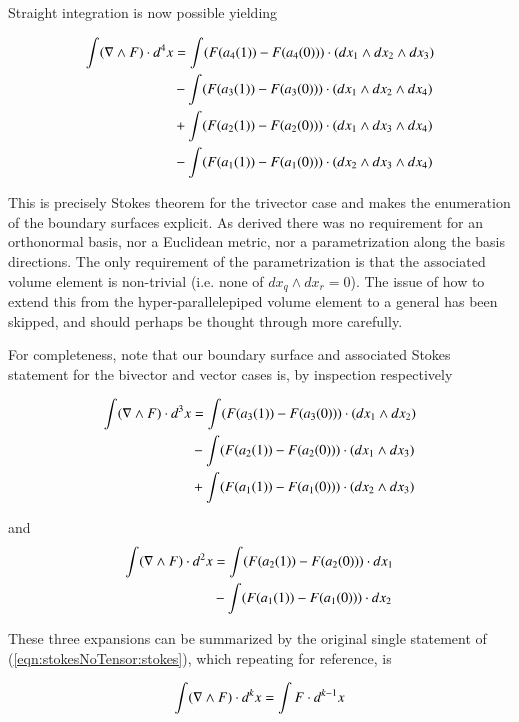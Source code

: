 Straight integration is now possible yielding

\begin{align*}
\int ( \nabla \wedge F ) \cdot d^4 x 
&= \int (F(a_4(1)) - F(a_4(0))) \cdot ( dx_1 \wedge dx_2 \wedge dx_3 ) \\
&- \int (F(a_3(1)) - F(a_3(0))) \cdot ( dx_1 \wedge dx_2 \wedge dx_4 ) \\
&+ \int (F(a_2(1)) - F(a_2(0))) \cdot ( dx_1 \wedge dx_3 \wedge dx_4 ) \\
&- \int (F(a_1(1)) - F(a_1(0))) \cdot ( dx_2 \wedge dx_3 \wedge dx_4 ) \\
\end{align*}

This is precisely Stokes theorem for the trivector case and makes the enumeration of the boundary surfaces explicit.  As derived there was no requirement for an orthonormal basis, nor a Euclidean metric, nor a parametrization along the basis directions.  The only requirement of the parametrization is that the associated volume element is non-trivial (i.e. none of $dx_q \wedge dx_r = 0$).  The issue of how to extend this from the hyper-parallelepiped volume element to a general has been skipped, and should perhaps be thought through more carefully.

For completeness, note that our boundary surface and associated Stokes statement for the bivector and vector cases is, by inspection respectively

\begin{align*}
\int ( \nabla \wedge F ) \cdot d^3 x 
&= \int (F(a_3(1)) - F(a_3(0))) \cdot ( dx_1 \wedge dx_2 ) \\
&- \int (F(a_2(1)) - F(a_2(0))) \cdot ( dx_1 \wedge dx_3 ) \\
&+ \int (F(a_1(1)) - F(a_1(0))) \cdot ( dx_2 \wedge dx_3 ) \\
\end{align*}

and
\begin{align*}
\int ( \nabla \wedge F ) \cdot d^2 x 
&= \int (F(a_2(1)) - F(a_2(0))) \cdot dx_1 \\
&- \int (F(a_1(1)) - F(a_1(0))) \cdot dx_2 \\
\end{align*}

These three expansions can be summarized by the original single statement of (\ref{eqn:stokesNoTensor:stokes}), which repeating for reference, is

\begin{align*}
\int ( \nabla \wedge F ) \cdot d^k x = \int F \cdot d^{k-1} x 
\end{align*}

